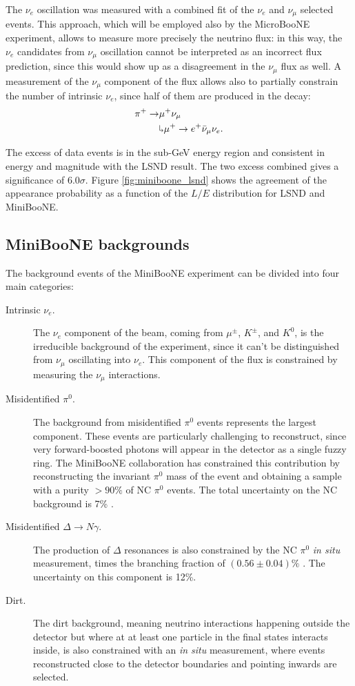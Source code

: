 The $\nu_{e}$ oscillation was measured with a combined fit of the $\nu_{e}$ and $\nu_{\mu}$ selected events. This approach, which will be employed also by the MicroBooNE experiment, allows to measure more precisely the neutrino flux: in this way, the $\nu_e$ candidates from $\nu_{\mu}$ oscillation cannot be interpreted as an incorrect flux prediction, since this would show up as a disagreement in the $\nu_{\mu}$ flux as well. A measurement of the $\nu_{\mu}$ component of the flux allows also to partially constrain the number of intrinsic $\nu_e$, since half of them are produced in the decay:
\begin{align}
    \pi^+ \rightarrow & \mu^+\nu_{\mu}\\
    & \rotatebox[origin=c]{180}{$\Lsh$}	 \mu^{+} \rightarrow e^+\bar{\nu}_{\mu}\nu_{e}.
\end{align}

The excess of data events is in the sub-GeV energy region and consistent in energy and magnitude with the LSND result. The two excess combined gives a significance of $6.0\sigma$. Figure \ref{fig:miniboone_lsnd} shows the agreement of the appearance probability as a function of the $L/E$ distribution for LSND and MiniBooNE. 

\subsection*{MiniBooNE backgrounds}
The background events of the MiniBooNE experiment can be divided into four main categories:
\begin{description}
    \item[Intrinsic $\nu_e$.] The $\nu_e$ component of the beam, coming from $\mu^{\pm}$, $K^{\pm}$, and $K^0$, is the irreducible background of the experiment, since it can't be distinguished from $\nu_{\mu}$ oscillating into $\nu_{e}$. This component of the flux is constrained by measuring the $\nu_{\mu}$ interactions.
    \item[Misidentified $\pi^0$.] The background from misidentified $\pi^0$ events represents the largest component. These events are particularly challenging to reconstruct, since very forward-boosted photons will appear in the detector as a single fuzzy ring. The MiniBooNE collaboration has constrained this contribution by reconstructing the invariant $\pi^0$ mass of the event and obtaining a sample with a purity $>90\%$ of NC $\pi^0$ events. The total uncertainty on the NC background is 7\% \cite{Karagiorgi:2010zz}.
    \item[Misidentified $\Delta\rightarrow N\gamma$.] The production of $\Delta$ resonances is also constrained by the NC $\pi^0$ \emph{in situ} measurement, times the branching fraction of $(0.56\pm0.04)\%$ \cite{PhysRevD.98.030001}. The uncertainty on this component is 12\%.
    \item[Dirt.] The dirt background, meaning neutrino interactions happening outside the detector but where at at least one particle in the final states interacts inside, is also constrained with an \emph{in situ} measurement, where events reconstructed close to the detector boundaries and pointing inwards are selected. 
\end{description}

